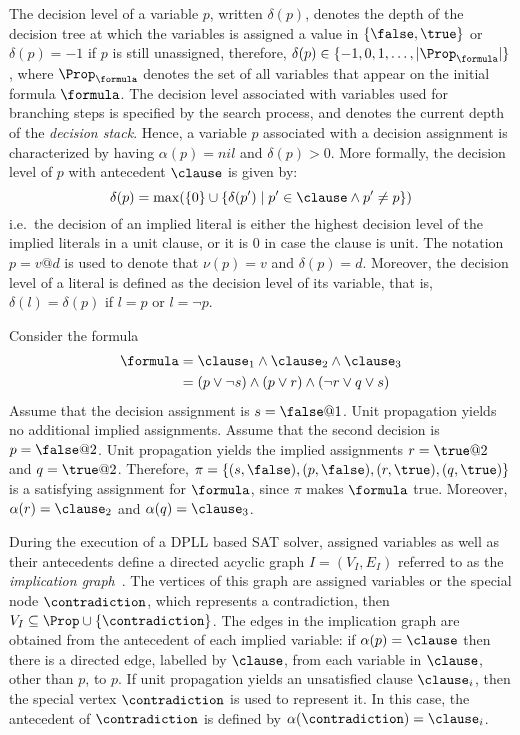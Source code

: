 The decision level of a variable $p$, written $\delta(p)$, denotes the depth of
the decision tree at which the variables is assigned a value in $\{\false,
\true\}$ or $\delta(p) = -1$ if $p$ is still unassigned, therefore, $\delta(p)
\in \{-1, 0, 1, \ldots, |\Prop_\formula|\}$, where $\Prop_\formula$ denotes the
set of all variables that appear on the initial formula $\formula$. The decision
level associated with variables used for branching steps is specified by the
search process, and denotes the current depth of the \emph{decision stack}.
Hence, a variable $p$ associated with a decision assignment is characterized by
having $\alpha(p) = nil$ and $\delta(p) > 0$. More formally, the decision level
of $p$ with antecedent $\clause$ is given by: 
\begin{equation}
    \delta(p) = \max(\{0\} \cup \{\delta(p') \mid p' \in \clause \land p' \neq p\})
\end{equation}
i.e.\ the decision of an implied literal is either the highest decision level of
the implied literals in a unit clause, or it is 0 in case the clause is unit.
The notation $p = v @ d$ is used to denote that $\nu(p) = v$ and $\delta(p) =
d$. Moreover, the decision level of a literal is defined as the decision level
of its variable, that is, $\delta(l) = \delta(p)$ if $l = p$ or $l = \neg p$.

\begin{example}
    Consider the formula 
    \begin{align*}
        \formula & = \clause_1 \land \clause_2 \land \clause_3\\
                 & = (p \lor \neg s) \land (p \lor r) \land (\neg r \lor q \lor s)
    \end{align*}
    Assume that the decision assignment is $s = \false @ 1$. Unit propagation
    yields no additional implied assignments. Assume that the second decision is
    $p = \false @ 2$. Unit propagation yields the implied assignments $r = \true
    @ 2$ and $q = \true @ 2$. Therefore, $\pi = \{(s, \false), (p, \false), (r,
    \true), (q, \true)\}$ is a satisfying assignment for $\formula$, since $\pi$
    makes $\formula$ true. Moreover, $\alpha(r) = \clause_2$ and $\alpha(q) =
    \clause_3$.
\end{example}

During the execution of a DPLL based SAT solver, assigned variables as well as
their antecedents define a directed acyclic graph $I = (V_I, E_I)$ referred to
as the \emph{implication graph}~\cite{silva1997grasp}. The vertices of this
graph are assigned variables or the special node $\contradiction$, which
represents a contradiction, then $V_I \subseteq \Prop \cup \{\contradiction\}$.
The edges in the implication graph are obtained from the antecedent of each
implied variable: if $\alpha(p) = \clause$ then there is a directed edge,
labelled by $\clause$, from each variable in $\clause$, other than $p$, to $p$.
If unit propagation yields an unsatisfied clause $\clause_i$, then the special
vertex $\contradiction$ is used to represent it. In this case, the antecedent of
$\contradiction$ is defined by $\alpha(\contradiction) = \clause_i$.

